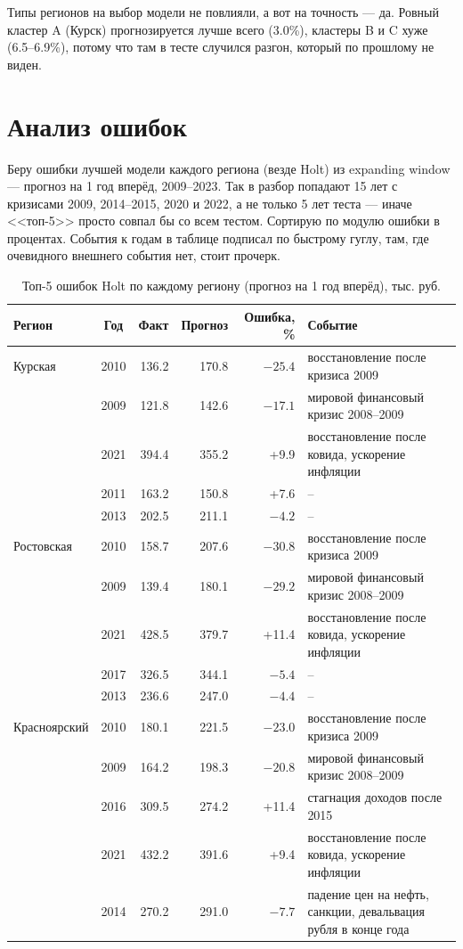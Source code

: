 \documentclass[12pt,a4paper]{report}
\begin{document}
Типы регионов на выбор модели не повлияли, а вот на точность --- да. Ровный кластер A (Курск) прогнозируется лучше всего (3.0\%), кластеры B и C хуже (6.5--6.9\%), потому что там в тесте случился разгон, который по прошлому не виден.

\chapter{Анализ ошибок}

Беру ошибки лучшей модели каждого региона (везде Holt) из expanding window --- прогноз на 1 год вперёд, 2009--2023. Так в разбор попадают 15 лет с кризисами 2009, 2014--2015, 2020 и 2022, а не только 5 лет теста --- иначе <<топ-5>> просто совпал бы со всем тестом. Сортирую по модулю ошибки в процентах. События к годам в таблице подписал по быстрому гуглу, там, где очевидного внешнего события нет, стоит прочерк.

\begin{table}[H]
\centering
\caption{Топ-5 ошибок Holt по каждому региону (прогноз на 1 год вперёд), тыс. руб.}
\label{tab:top5}
\small
\begin{tabular}{lcrrr>{\raggedright\arraybackslash}p{5.6cm}}
\toprule
Регион & Год & Факт & Прогноз & Ошибка, \% & Событие \\
\midrule
Курская & 2010 & 136.2 & 170.8 & $-25.4$ & восстановление после кризиса 2009 \\
 & 2009 & 121.8 & 142.6 & $-17.1$ & мировой финансовый кризис 2008--2009 \\
 & 2021 & 394.4 & 355.2 & +9.9 & восстановление после ковида, ускорение инфляции \\
 & 2011 & 163.2 & 150.8 & +7.6 & -- \\
 & 2013 & 202.5 & 211.1 & $-4.2$ & -- \\
\midrule
Ростовская & 2010 & 158.7 & 207.6 & $-30.8$ & восстановление после кризиса 2009 \\
 & 2009 & 139.4 & 180.1 & $-29.2$ & мировой финансовый кризис 2008--2009 \\
 & 2021 & 428.5 & 379.7 & +11.4 & восстановление после ковида, ускорение инфляции \\
 & 2017 & 326.5 & 344.1 & $-5.4$ & -- \\
 & 2013 & 236.6 & 247.0 & $-4.4$ & -- \\
\midrule
Красноярский & 2010 & 180.1 & 221.5 & $-23.0$ & восстановление после кризиса 2009 \\
 & 2009 & 164.2 & 198.3 & $-20.8$ & мировой финансовый кризис 2008--2009 \\
 & 2016 & 309.5 & 274.2 & +11.4 & стагнация доходов после 2015 \\
 & 2021 & 432.2 & 391.6 & +9.4 & восстановление после ковида, ускорение инфляции \\
 & 2014 & 270.2 & 291.0 & $-7.7$ & падение цен на нефть, санкции, девальвация рубля в конце года \\
\bottomrule
\end{tabular}
\end{table}
\end{document}
